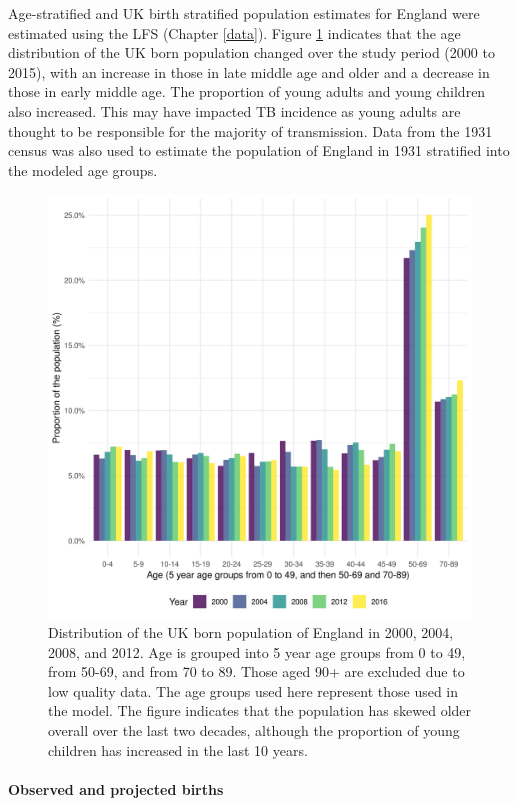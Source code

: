 \documentclass[11pt,twoside]{bristolthesis}
\begin{document}
  Age-stratified and UK birth stratified population estimates for England were estimated using the LFS (Chapter \ref{data}). Figure \ref{fig:age-strat-demo} indicates that the age distribution of the UK born population changed over the study period (2000 to 2015), with an increase in those in late middle age and older and a decrease in those in early middle age. The proportion of young adults and young children also increased. This may have impacted TB incidence as young adults are thought to be responsible for the majority of transmission. Data from the 1931 census was also used to estimate the population of England in 1931 stratified into the modeled age groups.
  \begin{figure}
  
  {\centering \includegraphics[width=0.8\linewidth,]{chapters/model-development/resources/figure/england_demographics} 
  
  }
  
  \caption[Distribution of the UK born population of England in 2000, 2004, 2008, and 2012.]{Distribution of the UK born population of England in 2000, 2004, 2008, and 2012. Age is grouped into 5 year age groups from 0 to 49, from 50-69, and from 70 to 89. Those aged 90+ are excluded due to low quality data. The age groups used here represent those used in the model. The figure indicates that the population has skewed older overall over the last two decades, although the proportion of young children has increased in the last 10 years.}\label{fig:age-strat-demo}
  \end{figure}
  \hypertarget{observed-and-projected-births}{%
  \paragraph{Observed and projected births}\label{observed-and-projected-births}}
  
\end{document}
